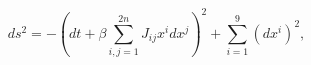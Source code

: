 \begin{equation}
\label{metgodelS}
ds^2 = - \left( dt + \beta \sum_{i,j=1}^{2n} J_{ij} x^i dx^j \right)^2
+ \sum_{i=1}^9 (dx^i)^2, 
\end{equation}

